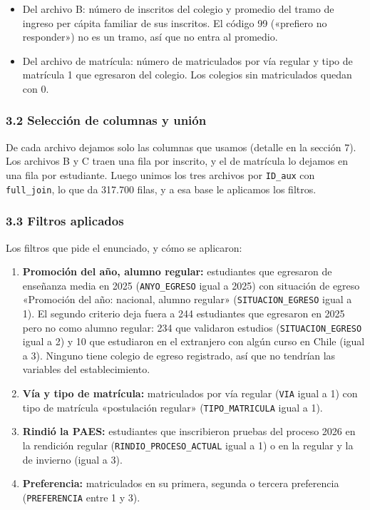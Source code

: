 \documentclass[11pt]{article}
\begin{document}
\begin{itemize}[leftmargin=1.5em, itemsep=0.3em]
  \item Del archivo B: número de inscritos del colegio y promedio del
        tramo de ingreso per cápita familiar de sus inscritos. El código
        99 («prefiero no responder») no es un tramo, así que no entra al
        promedio.
  \item Del archivo de matrícula: número de matriculados por vía regular y
        tipo de matrícula 1 que egresaron del colegio. Los colegios sin
        matriculados quedan con 0.
\end{itemize}

\subsubsection*{3.2 \; Selección de columnas y unión}

De cada archivo dejamos solo las columnas que usamos (detalle en la
sección 7). Los archivos B y C traen una fila por inscrito, y el de
matrícula lo dejamos en una fila por estudiante. Luego unimos
los tres archivos por \texttt{ID\_aux} con \texttt{full\_join}, lo que da
317.700 filas, y a esa base le aplicamos los filtros.

\subsubsection*{3.3 \; Filtros aplicados}

Los filtros que pide el enunciado, y cómo se aplicaron:

\begin{enumerate}[leftmargin=1.5em, itemsep=0.3em, label=\textbf{\alph*)}]
  \item \textbf{Promoción del año, alumno regular:} estudiantes que
        egresaron de enseñanza media en 2025 (\texttt{ANYO\_EGRESO} igual a
        2025) con situación de egreso «Promoción del año: nacional, alumno
        regular» (\texttt{SITUACION\_EGRESO} igual a 1). El segundo
        criterio deja fuera a 244 estudiantes que egresaron en 2025 pero no
        como alumno regular: 234 que validaron estudios
        (\texttt{SITUACION\_EGRESO} igual a 2) y 10 que estudiaron en el
        extranjero con algún curso en Chile (igual a 3). Ninguno tiene
        colegio de egreso registrado, así que no tendrían las variables del
        establecimiento.
  \item \textbf{Vía y tipo de matrícula:} matriculados por vía regular
        (\texttt{VIA} igual a 1) con tipo de matrícula «postulación
        regular» (\texttt{TIPO\_MATRICULA} igual a 1).
  \item \textbf{Rindió la PAES:} estudiantes que inscribieron pruebas del
        proceso 2026 en la rendición regular (\texttt{RINDIO\_PROCESO\_ACTUAL}
        igual a 1) o en la regular y la de invierno (igual a 3).
  \item \textbf{Preferencia:} matriculados en su primera, segunda o
        tercera preferencia (\texttt{PREFERENCIA} entre 1 y 3).
\end{enumerate}
\end{document}
